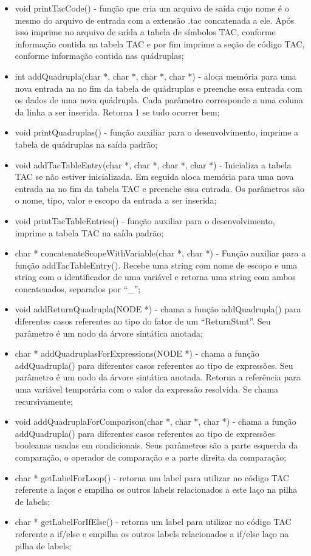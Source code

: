 \documentclass[12pt]{article}
\begin{document}
\begin{itemize}
	\item void printTacCode() - função que cria um arquivo de saída cujo nome é o mesmo do arquivo de entrada com a extensão .tac concatenada a ele. Após isso imprime no arquivo de saída a tabela de símbolos TAC, conforme informação contida na tabela TAC e por fim imprime a seção de código TAC, conforme informação contida nas quádruplas;
	\item int addQuadrupla(char *, char *, char *, char *) - aloca memória para uma nova entrada na no fim da tabela de quádruplas e preenche essa entrada com os dados de uma nova quádrupla. Cada parâmetro corresponde a uma coluna da linha a ser inserida. Retorna 1 se tudo ocorrer bem;
	\item void printQuadruplas() - função auxiliar para o desenvolvimento, imprime a tabela de quádruplas na saída padrão;
	\item void addTacTableEntry(char *, char *, char *, char *) - Inicializa a tabela TAC se não estiver inicializada. Em seguida aloca memória para uma nova entrada na no fim da tabela TAC e preenche essa entrada. Os parâmetros são o nome, tipo, valor e escopo da entrada a ser inserida;
	\item void printTacTableEntries() - função auxiliar para o desenvolvimento, imprime a tabela TAC na saída padrão;
	\item char * concatenateScopeWithVariable(char *, char *) - Função auxiliar para a função addTacTableEntry(). Recebe uma string com nome de escopo e uma string com o identificador de uma variável e retorna uma string com ambos concatenados, separados por ``\_'';
	\item void addReturnQuadrupla(NODE *) - chama a função addQuadrupla() para diferentes casos referentes ao tipo do fator de um ``ReturnStmt''. Seu parâmetro é um nodo da árvore sintática anotada;
	\item char * addQuadruplasForExpressions(NODE *) - chama a função addQuadrupla() para diferentes casos referentes ao tipo de expressões. Seu parâmetro é um nodo da árvore sintática anotada. Retorna a referência para uma variável temporária com o valor da expressão resolvida. Se chama recursivamente;
	\item void addQuadruplaForComparison(char *, char *, char *) - chama a função addQuadrupla() para diferentes casos referentes ao tipo de expressões booleanas usadas em condicionais. Seus parâmetros são a parte esquerda da comparação, o operador de comparação e a parte direita da comparação;
	\item char * getLabelForLoop() - retorna um label para utilizar no código TAC referente a laços e empilha os outros labels relacionados a este laço na pilha de labels;
	\item char * getLabelForIfElse() - retorna um label para utilizar no código TAC referente a if/else e empilha os outros labels relacionados a if/else laço na pilha de labels;
\end{itemize}
\end{document}

